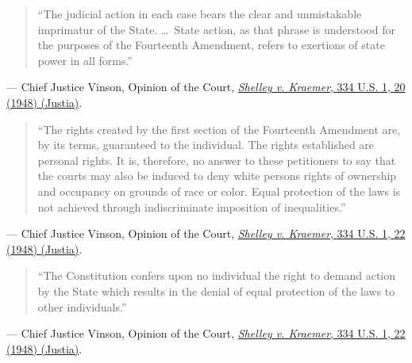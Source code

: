 \documentclass[12pt]{article}
\begin{document}
\begin{quote}
``The judicial action in each case bears the clear and unmistakable imprimatur of the State. \ldots\ State action, as that phrase is understood for the purposes of the Fourteenth Amendment, refers to exertions of state power in all forms.''
\end{quote}
\noindent --- Chief Justice Vinson, Opinion of the Court, \href{https://supreme.justia.com/cases/federal/us/334/1/}{\textit{Shelley v. Kraemer}, 334 U.S. 1, 20 (1948) (Justia)}.

\begin{quote}
``The rights created by the first section of the Fourteenth Amendment are, by its terms, guaranteed to the individual. The rights established are personal rights. It is, therefore, no answer to these petitioners to say that the courts may also be induced to deny white persons rights of ownership and occupancy on grounds of race or color. Equal protection of the laws is not achieved through indiscriminate imposition of inequalities.''
\end{quote}
\noindent --- Chief Justice Vinson, Opinion of the Court, \href{https://supreme.justia.com/cases/federal/us/334/1/}{\textit{Shelley v. Kraemer}, 334 U.S. 1, 22 (1948) (Justia)}.

\begin{quote}
``The Constitution confers upon no individual the right to demand action by the State which results in the denial of equal protection of the laws to other individuals.''
\end{quote}
\noindent --- Chief Justice Vinson, Opinion of the Court, \href{https://supreme.justia.com/cases/federal/us/334/1/}{\textit{Shelley v. Kraemer}, 334 U.S. 1, 22 (1948) (Justia)}.
\end{document}
